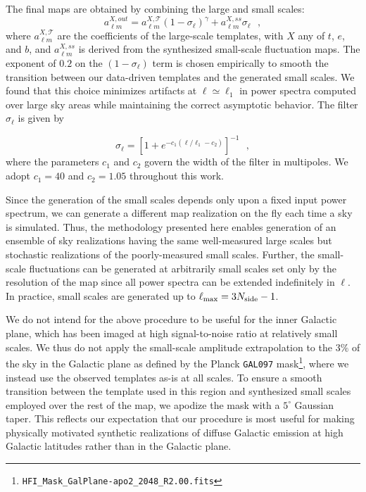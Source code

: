 \documentclass[twocolumn]{aastex631}
\begin{document}
The final maps are obtained by combining the large and small scales: 
\begin{equation} \label{eq:filter}
    a_{\ell m }^{X, out}=  a_{\ell m }^{X, \mathcal{T}} \left(1-\sigma_\ell\right)^{\gamma} + a_{\ell m }^{X, ss} \sigma_\ell
    ~~~, 
\end{equation}
where $a_{\ell m }^{X, \mathcal{T}}$ are the coefficients of the large-scale templates, with $X$ any of $t$, $e$, and $b$, and $a_{\ell m }^{X, ss}$ is derived from the synthesized small-scale fluctuation maps. The exponent of $0.2$ on the $\left(1-\sigma_\ell\right)$ term is chosen empirically to smooth the transition between our data-driven templates and the generated small scales. We found that this choice minimizes artifacts at $\ell \simeq \ell_1$ in power spectra computed over large sky areas while maintaining the correct asymptotic behavior. The filter $\sigma_\ell$ is given by

\begin{equation} \label{eq:filter2}
\sigma_\ell  = \left[1+  e^{ -c_1 (\ell/ \ell_1  -c_2 )}\right]^{-1}  
~~~,
\end{equation}
where the parameters $c_1$ and $c_2$ govern the width of the filter in multipoles. We adopt $c_1=40$ and $c_2=1.05$ throughout this work.

Since the generation of the small scales depends only upon a fixed input power spectrum, we can generate a different map realization on the fly each time a sky is simulated. Thus, the methodology presented here enables generation of an ensemble of sky realizations having the same well-measured large scales but stochastic realizations of the poorly-measured small scales. Further, the small-scale fluctuations can be generated at arbitrarily small scales set only by the resolution of the map since all power spectra can be extended indefinitely in $\ell$. In practice, small scales are generated up to $\ell_{\rm max} = 3N_{\rm side}-1$.

We do not intend for the above procedure to be useful for the inner Galactic plane, which has been imaged at high signal-to-noise ratio at relatively small scales. We thus do not apply the small-scale amplitude extrapolation to the $3\%$ of the sky in the Galactic plane as defined by the Planck \texttt{GAL097} mask\footnote{\texttt{HFI\_Mask\_GalPlane-apo2\_2048\_R2.00.fits}}, where we instead use the observed templates as-is at all scales. To ensure a smooth transition between the template used in this region and synthesized small scales employed over the rest of the map, we apodize the mask with a $5^\circ$ Gaussian taper. This reflects our expectation that our procedure is most useful for making physically motivated synthetic realizations of diffuse Galactic emission at high Galactic latitudes rather than in the Galactic plane.
\end{document}
